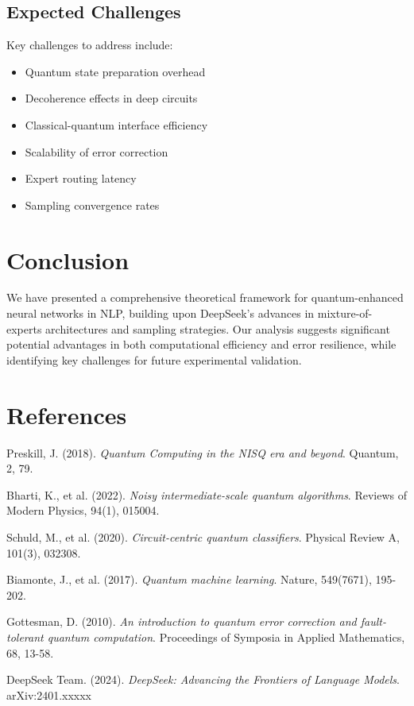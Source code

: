 \documentclass{article}
\begin{document}
\subsection{Expected Challenges}
Key challenges to address include:

\begin{itemize}
\item Quantum state preparation overhead
\item Decoherence effects in deep circuits
\item Classical-quantum interface efficiency
\item Scalability of error correction
\item Expert routing latency
\item Sampling convergence rates
\end{itemize}

\section{Conclusion}
We have presented a comprehensive theoretical framework for quantum-enhanced neural networks in NLP, building upon DeepSeek's advances in mixture-of-experts architectures and sampling strategies. Our analysis suggests significant potential advantages in both computational efficiency and error resilience, while identifying key challenges for future experimental validation.

\section{References}
\begin{thebibliography}{9}

Preskill, J. (2018).
\textit{Quantum Computing in the NISQ era and beyond}.
Quantum, 2, 79.

Bharti, K., et al. (2022).
\textit{Noisy intermediate-scale quantum algorithms}.
Reviews of Modern Physics, 94(1), 015004.

Schuld, M., et al. (2020).
\textit{Circuit-centric quantum classifiers}.
Physical Review A, 101(3), 032308.

Biamonte, J., et al. (2017).
\textit{Quantum machine learning}.
Nature, 549(7671), 195-202.

Gottesman, D. (2010).
\textit{An introduction to quantum error correction and fault-tolerant quantum computation}.
Proceedings of Symposia in Applied Mathematics, 68, 13-58.

DeepSeek Team. (2024).
\textit{DeepSeek: Advancing the Frontiers of Language Models}.
arXiv:2401.xxxxx

\end{thebibliography}
\end{document}
